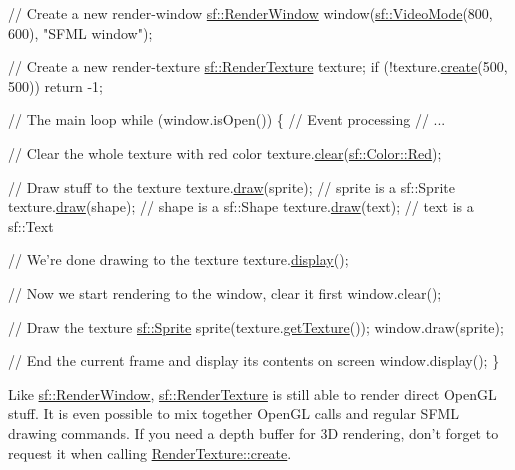 \begin{DoxyCode}
\textcolor{comment}{// Create a new render-window}
\hyperlink{classsf_1_1_render_window}{sf::RenderWindow} window(\hyperlink{classsf_1_1_video_mode}{sf::VideoMode}(800, 600), \textcolor{stringliteral}{"SFML window"});

\textcolor{comment}{// Create a new render-texture}
\hyperlink{classsf_1_1_render_texture}{sf::RenderTexture} texture;
\textcolor{keywordflow}{if} (!texture.\hyperlink{classsf_1_1_render_texture_aefbb76eb3b87e368ab974b2660931ccb}{create}(500, 500))
    \textcolor{keywordflow}{return} -1;

\textcolor{comment}{// The main loop}
\textcolor{keywordflow}{while} (window.isOpen())
\{
   \textcolor{comment}{// Event processing}
   \textcolor{comment}{// ...}

   \textcolor{comment}{// Clear the whole texture with red color}
   texture.\hyperlink{classsf_1_1_render_target_a6bb6f0ba348f2b1e2f46114aeaf60f26}{clear}(\hyperlink{classsf_1_1_color_a7052b1c5408a953e25f9691e0e828c9d}{sf::Color::Red});

   \textcolor{comment}{// Draw stuff to the texture}
   texture.\hyperlink{classsf_1_1_render_target_a12417a3bcc245c41d957b29583556f39}{draw}(sprite);  \textcolor{comment}{// sprite is a sf::Sprite}
   texture.\hyperlink{classsf_1_1_render_target_a12417a3bcc245c41d957b29583556f39}{draw}(shape);   \textcolor{comment}{// shape is a sf::Shape}
   texture.\hyperlink{classsf_1_1_render_target_a12417a3bcc245c41d957b29583556f39}{draw}(text);    \textcolor{comment}{// text is a sf::Text}

   \textcolor{comment}{// We're done drawing to the texture}
   texture.\hyperlink{classsf_1_1_render_texture_af92886d5faef3916caff9fa9ab32c555}{display}();

   \textcolor{comment}{// Now we start rendering to the window, clear it first}
   window.clear();

   \textcolor{comment}{// Draw the texture}
   \hyperlink{classsf_1_1_sprite}{sf::Sprite} sprite(texture.\hyperlink{classsf_1_1_render_texture_a95bc5152c497066d31fdc57da8e17678}{getTexture}());
   window.draw(sprite);

   \textcolor{comment}{// End the current frame and display its contents on screen}
   window.display();
\}
\end{DoxyCode}


Like \hyperlink{classsf_1_1_render_window}{sf\-::\-Render\-Window}, \hyperlink{classsf_1_1_render_texture}{sf\-::\-Render\-Texture} is still able to render direct Open\-G\-L stuff. It is even possible to mix together Open\-G\-L calls and regular S\-F\-M\-L drawing commands. If you need a depth buffer for 3\-D rendering, don't forget to request it when calling \hyperlink{classsf_1_1_render_texture_aefbb76eb3b87e368ab974b2660931ccb}{Render\-Texture\-::create}.

